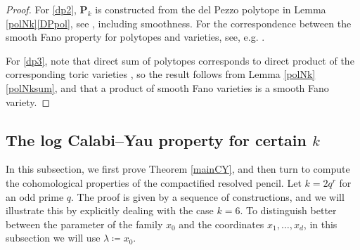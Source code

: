 \documentclass[12pt,reqno]{amsart}
\theoremstyle{definition}
\theoremstyle{plain}
\theoremstyle{definition}
\newcommand{\PP}{\mathbf{P}}
\begin{document}
\begin{proof} 
For \eqref{dp2}, $\PP_k$ is constructed from the del Pezzo polytope in Lemma \ref{polNk}\eqref{DPpol}, see \cite[p.\ 234]{KlyachkoVoskresenskii}, including smoothness.  For the correspondence between the smooth Fano property for polytopes and varieties, see, e.g. \cite[V.8.3-8.4; VII.8.4-8.6; pp.\ 329--330]{Ewaldbook}.

For \eqref{dp3}, note that direct sum of polytopes corresponds to direct product of the corresponding toric varieties \cite[pp.\ 329--330]{Ewaldbook}, so the result follows from Lemma \ref{polNk}\eqref{polNksum}, and that a product of smooth Fano varieties is a smooth Fano variety. 
\end{proof} 



\subsection{The log Calabi--Yau property for certain $k$}


In this subsection, we first prove Theorem \ref{mainCY}, and then turn to compute the cohomological properties of the compactified resolved pencil. Let $k=2q^r$ for an odd prime $q$. The proof is given by a sequence of constructions, and we will illustrate this by explicitly dealing with the case $k=6$. To distinguish better between the parameter of the family $x_0$ and the coordinates $x_1,\dots,x_d$, in this subsection we will use $\lambda \coloneqq  x_0$.
\end{document}
